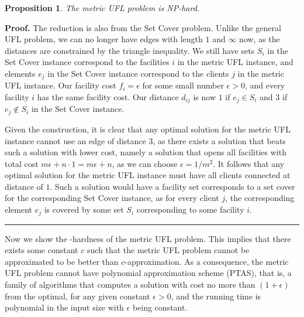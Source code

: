 \documentclass[oneside,final]{ucr}
\newtheorem{proposition}[theorem]{Proposition}
\newenvironment{proof}[1][Proof]{\textbf{#1.} }{\ \rule{0.5em}{0.5em}}
\begin{document}
\begin{proposition} \label{prop:metricNP}
  The metric UFL problem is NP-hard.
\end{proposition}
\begin{proof}
  The reduction is also from the Set Cover problem. Unlike the general
  UFL problem, we can no longer have edges with length $1$ and
  $\infty$ now, as the distances are constrained by the triangle
  inequality. We still have sets $S_i$ in the Set Cover instance
  correspond to the facilities $i$ in the metric UFL instance, and
  elements $e_j$ in the Set Cover instance correspond to the clients
  $j$ in the metric UFL instance. Our facility cost $f_i = \epsilon$
  for some small number $\epsilon > 0$, and every facility $i$ has the
  same facility cost. Our distance $d_{ij}$ is now $1$ if $e_j \in
  S_i$ and $3$ if $e_j \notin S_i$ in the Set Cover instance.

  Given the construction, it is clear that any optimal solution for
  the metric UFL instance cannot use an edge of distance $3$, as there
  exists a solution that beats such a solution with lower cost, namely
  a solution that opens all facilities with total cost $m\epsilon +
  n\cdot 1 = m\epsilon + n$, as we can choose $\epsilon = 1/m^2$. It
  follows that any optimal solution for the metric UFL instance must
  have all clients connected at distance of $1$. Such a solution would
  have a facility set corresponds to a set cover for the corresponding
  Set Cover instance, as for every client $j$, the corresponding
  element $e_j$ is covered by some set $S_i$ corresponding to some
  facility $i$.
\end{proof}

Now we show the {\MaxSNP}-hardness of the metric UFL problem. This
implies that there exists some constant $c$ such that the metric UFL
problem cannot be approximated to be better than $c$-approximation. As
a consequence, the metric UFL problem cannot have polynomial
approximation scheme (PTAS), that is, a family of algorithms that
computes a solution with cost no more than $(1+\epsilon)$ from the
optimal, for any given constant $\epsilon > 0$, and the running time
is polynomial in the input size with $\epsilon$ being constant.
\end{document}
